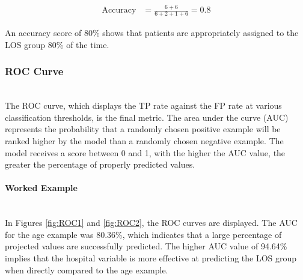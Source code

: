 \documentclass[../thesis.tex]{subfiles}
\begin{document}
\begin{align}
    \text{Accuracy}  &= \frac{6+6}{6+2+1+6}= 0.8
\end{align}

An accuracy score of 80\% shows that patients are appropriately assigned to the LOS group 80\% of the time.


\subsubsection{ROC Curve}\\
The ROC curve, which displays the TP rate against the FP rate at various classification thresholds, is the final metric. The area under the curve (AUC) represents the probability that a randomly chosen positive example will be ranked higher by the model than a randomly chosen negative example. The model receives a score between 0 and 1, with the higher the AUC value, the greater the percentage of properly predicted values.

\paragraph{Worked Example}\\
In Figures \ref{fig:ROC1} and \ref{fig:ROC2}, the ROC curves are displayed. The AUC for the age example was 80.36\%, which indicates that a large percentage of projected values are successfully predicted. The higher AUC value of 94.64\% implies that the hospital variable is more effective at predicting the LOS group when directly compared to the age example.
\end{document}
